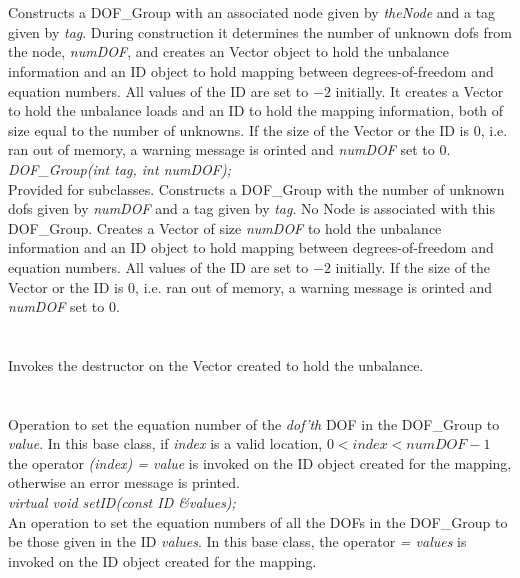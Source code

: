   \\
  \\
Constructs a  DOF\_Group with an associated node given by {\em
theNode} and a tag given by {\em tag}. During construction it
determines the number of unknown dofs from the node, {\em numDOF}, and
creates an Vector object to hold the unbalance information and an ID
object to hold mapping between degrees-of-freedom and equation
numbers. All values of the ID are set to $-2$ initially. It creates a
Vector to hold the unbalance loads and an ID to 
hold the mapping information, both of size equal to the number of
unknowns. If the size of the Vector or the ID is $0$, i.e. ran out of
memory, a warning message is orinted and {\em numDOF} set to $0$. \\

{\em DOF\_Group(int tag, int numDOF);}  \\
Provided for subclasses. Constructs a  DOF\_Group with the number of
unknown dofs given by {\em numDOF} and a tag given by {\em tag}. No
Node is associated with this DOF\_Group. Creates a Vector of size {\em
numDOF} to hold the unbalance information and an ID object to
hold mapping between degrees-of-freedom and equation numbers. All
values of the ID are set to $-2$ initially. If
the size of the Vector or the ID is $0$, i.e. ran out of memory, a
warning message is orinted and {\em numDOF} set to $0$. \\

  \\
  \\
Invokes the destructor on the Vector created to hold the unbalance. \\

  \\
 \\
Operation to set the equation number of the {\em dof'th} DOF in the
DOF\_Group to {\em value}. In this base class, if {\em index} is a
valid location, $0 < index < numDOF-1$ the operator {\em (index) =
value} is invoked on the ID object created for the mapping, otherwise
an error message is printed. \\ 


{\em virtual void setID(const ID \&values);} \\
An operation to set the equation numbers of all the DOFs in the
DOF\_Group to be those given in the ID {\em values}. In this base
class, the operator {\em = values} is invoked on the ID object created
for the mapping. \\ 

